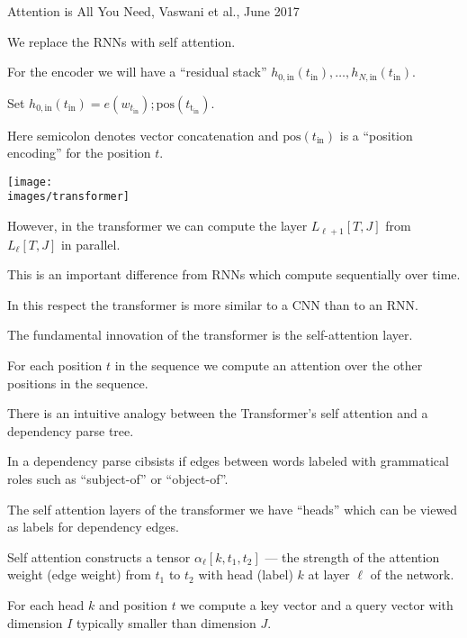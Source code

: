 {

Attention is All You Need, Vaswani et al., June 2017

\vfill
We replace the RNNs with self attention.

\vfill
For the encoder we will have a ``residual stack'' $h_{0,\mathrm{in}}(t_\mathrm{in}),\ldots,h_{N,\mathrm{in}}(t_\mathrm{in})$.

\vfill
Set $h_{0,\mathrm{in}}(t_\mathrm{in}) = e(w_{t_\mathrm{in}});\mathrm{pos}(t_\mathrm{t_\mathrm{in}})$.

\vfill
Here semicolon denotes vector concatenation and $\mathrm{pos}(t_\mathrm{in})$ is a ``position encoding'' for the position $t$.

\centerline{\texttt{[image: \\images/transformer]}}



However, in the transformer we can compute the layer $L_{\ell+1}[T,J]$ from $L_\ell[T,J]$ in parallel.

\vfill
This is an important difference from RNNs which compute sequentially over time.

\vfill
In this respect the transformer is more similar to a CNN than to an RNN.


The fundamental innovation of the transformer is the self-attention layer.

\vfill
For each position $t$ in the sequence we compute an attention over the other positions in the sequence.


There is an intuitive analogy between the Transformer's self attention and a dependency parse tree.

\vfill
In a dependency parse cibsists if edges between words labeled with grammatical roles such as ``subject-of'' or ``object-of''.

\vfill
The self attention layers of the transformer we have ``heads'' which can be viewed as labels for dependency edges.

\vfill
Self attention constructs a tensor $\alpha_\ell[k,t_1,t_2]$ --- the strength of the attention weight (edge weight)
from $t_1$ to $t_2$ with head (label) $k$ at layer $\ell$ of the network.


For each head $k$ and position $t$ we compute a key vector and a query vector with dimension $I$ typically smaller than dimension $J$.

}
